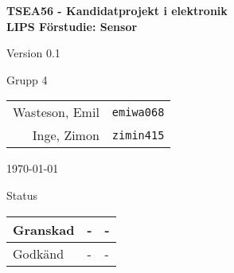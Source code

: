 \documentclass[11pt]{article}
\begin{document}
\begin{titlepage}
\begin{center}

{\Large\bfseries TSEA56 - Kandidatprojekt i elektronik \\ LIPS Förstudie: Sensor}

\vspace{5em}

Version 0.1

\vspace{5em}
Grupp 4 \\
\begin{tabular}{rl}
Wasteson, Emil&\verb+emiwa068+
\\
Inge, Zimon&\verb+zimin415+
\\
\end{tabular}

\vspace{5em}
\today

\vspace{16em}
Status
\begin{longtable}{|l|l|l|} \hline

Granskad & - & - \\ \hline
Godkänd & - & - \\ \hline
 
\end{longtable}


\end{center}
\end{titlepage}
\end{document}
